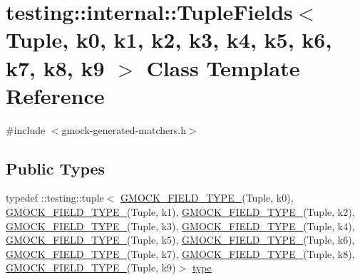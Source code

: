 \hypertarget{classtesting_1_1internal_1_1_tuple_fields}{}\section{testing\+:\+:internal\+:\+:Tuple\+Fields$<$ Tuple, k0, k1, k2, k3, k4, k5, k6, k7, k8, k9 $>$ Class Template Reference}
\label{classtesting_1_1internal_1_1_tuple_fields}


{\ttfamily \#include $<$gmock-\/generated-\/matchers.\+h$>$}

\subsection*{Public Types}
\begin{DoxyCompactItemize}
\item 
typedef \+::testing\+::tuple$<$ \hyperlink{gmock-generated-matchers_8h_acf3e27de83a73f0d873da1cd471e505b}{G\+M\+O\+C\+K\+\_\+\+F\+I\+E\+L\+D\+\_\+\+T\+Y\+P\+E\+\_\+}(Tuple, k0), \hyperlink{gmock-generated-matchers_8h_acf3e27de83a73f0d873da1cd471e505b}{G\+M\+O\+C\+K\+\_\+\+F\+I\+E\+L\+D\+\_\+\+T\+Y\+P\+E\+\_\+}(Tuple, k1), \hyperlink{gmock-generated-matchers_8h_acf3e27de83a73f0d873da1cd471e505b}{G\+M\+O\+C\+K\+\_\+\+F\+I\+E\+L\+D\+\_\+\+T\+Y\+P\+E\+\_\+}(Tuple, k2), \hyperlink{gmock-generated-matchers_8h_acf3e27de83a73f0d873da1cd471e505b}{G\+M\+O\+C\+K\+\_\+\+F\+I\+E\+L\+D\+\_\+\+T\+Y\+P\+E\+\_\+}(Tuple, k3), \hyperlink{gmock-generated-matchers_8h_acf3e27de83a73f0d873da1cd471e505b}{G\+M\+O\+C\+K\+\_\+\+F\+I\+E\+L\+D\+\_\+\+T\+Y\+P\+E\+\_\+}(Tuple, k4), \hyperlink{gmock-generated-matchers_8h_acf3e27de83a73f0d873da1cd471e505b}{G\+M\+O\+C\+K\+\_\+\+F\+I\+E\+L\+D\+\_\+\+T\+Y\+P\+E\+\_\+}(Tuple, k5), \hyperlink{gmock-generated-matchers_8h_acf3e27de83a73f0d873da1cd471e505b}{G\+M\+O\+C\+K\+\_\+\+F\+I\+E\+L\+D\+\_\+\+T\+Y\+P\+E\+\_\+}(Tuple, k6), \hyperlink{gmock-generated-matchers_8h_acf3e27de83a73f0d873da1cd471e505b}{G\+M\+O\+C\+K\+\_\+\+F\+I\+E\+L\+D\+\_\+\+T\+Y\+P\+E\+\_\+}(Tuple, k7), \hyperlink{gmock-generated-matchers_8h_acf3e27de83a73f0d873da1cd471e505b}{G\+M\+O\+C\+K\+\_\+\+F\+I\+E\+L\+D\+\_\+\+T\+Y\+P\+E\+\_\+}(Tuple, k8), \hyperlink{gmock-generated-matchers_8h_acf3e27de83a73f0d873da1cd471e505b}{G\+M\+O\+C\+K\+\_\+\+F\+I\+E\+L\+D\+\_\+\+T\+Y\+P\+E\+\_\+}(Tuple, k9)$>$ \hyperlink{classtesting_1_1internal_1_1_tuple_fields_a5480877377ebc94bf3a6c6cab5c369bc}{type}
\end{DoxyCompactItemize}
